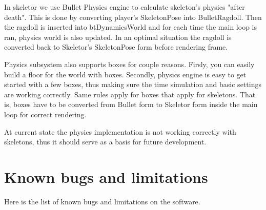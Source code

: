 \documentclass[11pt,twoside,a4paper]{article}
\begin{document}
In skeletor we use Bullet Physics engine to calculate skeleton's physics "after death". This is done by converting player's SkeletonPose into BulletRagdoll. Then the ragdoll is inserted into btDynamicsWorld and for each time the main loop is ran, physics world is also updated. In an optimal situation the ragdoll is converted back to Skeletor's SkeletonPose form before rendering frame.

Physics subsystem also supports boxes for couple reasons. Firsly, you can easily build a floor for the world with boxes. Secondly, physics engine is easy to get started with a few boxes, thus making sure the time simulation and basic settings are working correctly. Same rules apply for boxes that apply for skeletons. That is, boxes have to be converted from Bullet form to Skeletor form inside the main loop for correct rendering.

At current state the physics implementation is not working correctly with skeletons, thus it should serve as a basis for future development.

\section{Known bugs and limitations}

Here is the list of known bugs and limitations on the software.
\end{document}
